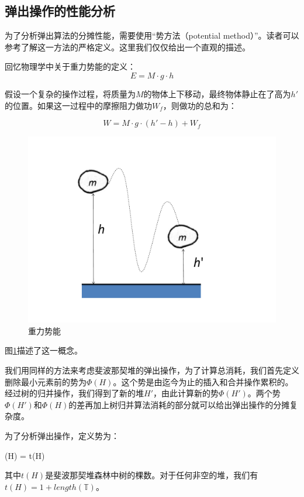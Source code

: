 \documentclass[b5paper]{ctexart}
\begin{document}
\subsection{弹出操作的性能分析}

为了分析弹出算法的分摊性能，需要使用“势方法（potential method）”。读者可以参考\cite{CLRS}了解这一方法的严格定义。这里我们仅仅给出一个直观的描述。

回忆物理学中关于重力势能的定义：
\[
E = M \cdot g \cdot h
\]

假设一个复杂的操作过程，将质量为$M$的物体上下移动，最终物体静止在了高为$h'$的位置。如果这一过程中的摩擦阻力做功$W_f$，则做功的总和为：

\[
W = M \cdot g \cdot (h' - h) + W_f
\]

\begin{figure}[htbp]
  \centering
  \includegraphics[scale=0.5]{img/potential-energy}
  \caption{重力势能}
  \label{fig:potential-energy}
\end{figure}

图\ref{fig:potential-energy}描述了这一概念。

我们用同样的方法来考虑斐波那契堆的弹出操作，为了计算总消耗，我们首先定义删除最小元素前的势为$\Phi(H)$。这个势是由迄今为止的插入和合并操作累积的。经过树的归并操作，我们得到了新的堆$H'$，由此计算新的势$\Phi(H')$。两个势$\Phi(H')$和$\Phi(H)$的差再加上树归并算法消耗的部分就可以给出弹出操作的分摊复杂度。

为了分析弹出操作，定义势为：

\be
\Phi(H) = t(H)
\ee

其中$t(H)$是斐波那契堆森林中树的棵数。对于任何非空的堆，我们有$t(H) = 1 + length(\mathbb{T})$。
\end{document}
